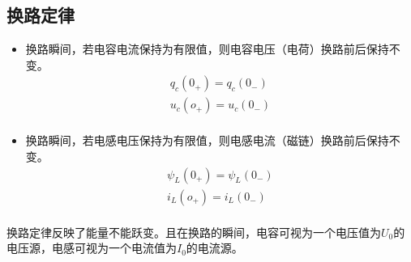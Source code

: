 \documentclass[11pt,a4paper,oneside]{book}
\begin{document}
\subsection{换路定律}
\begin{itemize}
	\item 换路瞬间，若电容电流保持为有限值，则电容电压（电荷）换路前后保持不变。
	\begin{equation}
		\begin{aligned}
			q_c(0_+)=q_c(0_-)\\ 
			u_c(o_+)=u_c(0_-) \\
		\end{aligned}
	\end{equation}
\item 换路瞬间，若电感电压保持为有限值，则电感电流（磁链）换路前后保持不变。
	\begin{equation}
		\begin{aligned}
			\psi_L(0_+)=\psi_L(0_-)\\ 
			i_L(o_+)=i_L(0_-) \\
		\end{aligned}
	\end{equation}
\end{itemize}
换路定律反映了能量不能跃变。且在换路的瞬间，电容可视为一个电压值为$U_0$的电压源，电感可视为一个电流值为$I_0$的电流源。
\end{document}
